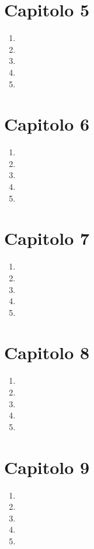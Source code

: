 \section*{Capitolo 5}
\begin{enumerate}
	\item
	\item
	\item
	\item
	\item
\end{enumerate}
\section*{Capitolo 6}
\begin{enumerate}
	\item
	\item
	\item
	\item
	\item
\end{enumerate}
\section*{Capitolo 7}
\begin{enumerate}
	\item
	\item
	\item
	\item
	\item
\end{enumerate}
\section*{Capitolo 8}
\begin{enumerate}
	\item
	\item
	\item
	\item
	\item
\end{enumerate}
\section*{Capitolo 9}
\begin{enumerate}
	\item
	\item
	\item
	\item
	\item
\end{enumerate}
